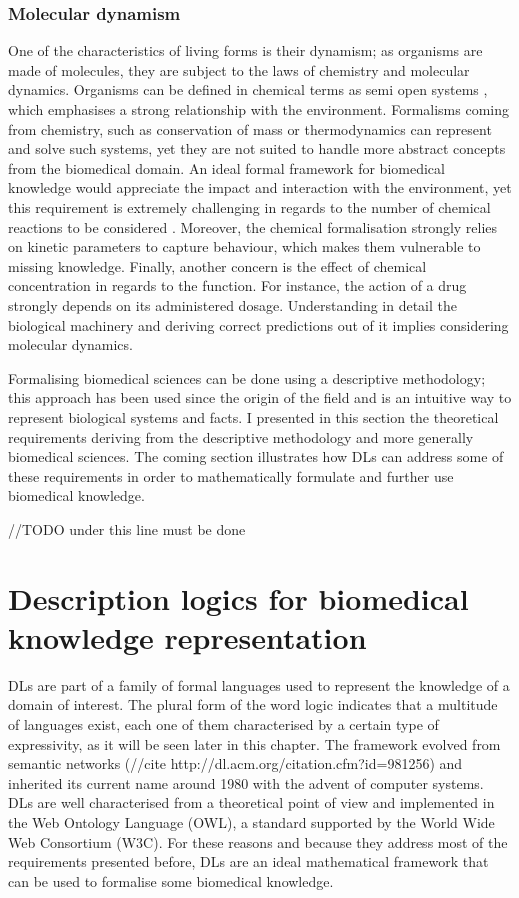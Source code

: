 \subsubsection{Molecular dynamism}

One of the characteristics of living forms is their dynamism; as organisms are made of molecules, they are subject to the laws of chemistry and molecular dynamics. Organisms can be defined in chemical terms as semi open systems \citep{meng2004modeling}, which emphasises a strong relationship with the environment. Formalisms coming from chemistry, such as conservation of mass \citep{masswiki} or thermodynamics \citep{thermowiki} can represent and solve such systems, yet they are not suited to handle more abstract concepts from the biomedical domain. An ideal formal framework for biomedical knowledge would appreciate the impact and interaction with the environment, yet this requirement is extremely challenging in regards to the number of chemical reactions to be considered \citep{meng2004modeling}. Moreover, the chemical formalisation strongly relies on kinetic parameters to capture behaviour, which makes them vulnerable to missing knowledge. Finally, another concern is the effect of chemical concentration in regards to the function. For instance, the action of a drug strongly depends on its administered dosage. Understanding in detail the biological machinery and deriving correct predictions out of it implies considering molecular dynamics.

Formalising biomedical sciences can be done using a descriptive methodology; this approach has been used since the origin of the field and is an intuitive way to represent biological systems and facts. I presented in this section the theoretical requirements deriving from the descriptive methodology and more generally biomedical sciences. The coming section illustrates how DLs can address some of these requirements in order to mathematically formulate and further use biomedical knowledge.

//TODO under this line must be done

\section{Description logics for biomedical knowledge representation}

DLs are part of a family of formal languages used to represent the knowledge of a domain of interest. The plural form of the word logic indicates that a multitude of languages exist, each one of them characterised by a certain type of expressivity, as it will be seen later in this chapter. The framework evolved from semantic networks (//cite http://dl.acm.org/citation.cfm?id=981256) and inherited its current name around 1980 with the advent of computer systems. DLs are well characterised from a theoretical point of view and implemented in the Web Ontology Language (OWL), a standard supported by the World Wide Web Consortium (W3C). For these reasons and because they address most of the requirements presented before, DLs are an ideal mathematical framework that can be used to formalise some biomedical knowledge.


